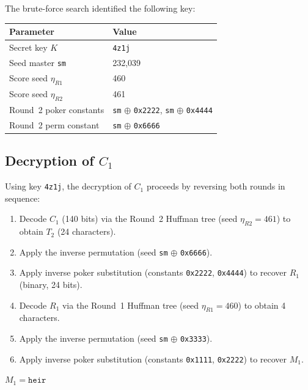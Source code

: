 \documentclass[12pt,a4paper]{article}
\begin{document}
The brute-force search identified the following key:

\begin{center}
\begin{tabular}{ll}
\toprule
\textbf{Parameter} & \textbf{Value} \\
\midrule
Secret key $K$          & \texttt{4z1j} \\
Seed master \texttt{sm} & 232{,}039 \\
Score seed $\eta_{R1}$  & 460 \\
Score seed $\eta_{R2}$  & 461 \\
Round~2 poker constants & \texttt{sm} $\oplus$ \texttt{0x2222}, \texttt{sm} $\oplus$ \texttt{0x4444} \\
Round~2 perm constant   & \texttt{sm} $\oplus$ \texttt{0x6666} \\
\bottomrule
\end{tabular}
\end{center}

\subsection{Decryption of $C_1$}

Using key \texttt{4z1j}, the decryption of $C_1$ proceeds by reversing both rounds in sequence:

\begin{enumerate}[noitemsep]
    \item Decode $C_1$ (140 bits) via the Round~2 Huffman tree (seed $\eta_{R2} = 461$) to obtain $T_2$ (24 characters).
    \item Apply the inverse permutation (seed \texttt{sm} $\oplus$ \texttt{0x6666}).
    \item Apply inverse poker substitution (constants \texttt{0x2222}, \texttt{0x4444}) to recover $R_1$ (binary, 24 bits).
    \item Decode $R_1$ via the Round~1 Huffman tree (seed $\eta_{R1} = 460$) to obtain 4 characters.
    \item Apply the inverse permutation (seed \texttt{sm} $\oplus$ \texttt{0x3333}).
    \item Apply inverse poker substitution (constants \texttt{0x1111}, \texttt{0x2222}) to recover $M_1$.
\end{enumerate}

\begin{center}
\large
$M_1 = \texttt{heir}$
\end{center}
\end{document}
